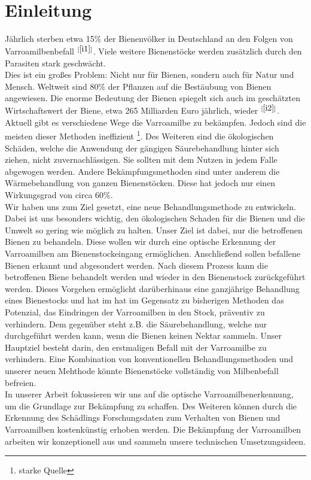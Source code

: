 \documentclass[11pt,a4paper]{article}
\newcommand{\bibRef}[1]{\hyperlink{#1}{$^{[\ref*{#1}{}]}$}}
\begin{document}
\section{Einleitung}
Jährlich sterben etwa 15\% der Bienenvölker in Deutschland an den Folgen von Varroamilbenbefall \bibRef{i1}.
Viele weitere Bienenstöcke werden zusätzlich durch den Parasiten stark geschwächt.\\
Dies ist ein großes Problem: Nicht nur für Bienen, sondern auch für Natur und Mensch. Weltweit sind 80\% der Pflanzen auf die Bestäubung von Bienen angewiesen. Die enorme Bedeutung der Bienen spiegelt sich auch im geschätzten Wirtschaftswert der Biene, etwa 265 Milliarden Euro jährlich, wieder \bibRef{i2}.
Aktuell gibt es verschiedene Wege die Varroamilbe zu bekämpfen. Jedoch sind die meisten dieser Methoden ineffizient \footnote{starke Quelle}. Des Weiteren sind die ökologischen Schäden, welche die Anwendung der gängigen Säurebehandlung hinter sich ziehen, nicht zuvernachlässigen. Sie sollten mit dem Nutzen in jedem Falle abgewogen werden. Andere Bekämpfungsmethoden sind unter anderem die Wärmebehandlung von ganzen Bienenstöcken. Diese hat jedoch nur einen Wirkungsgrad von circa 60\%.\\
Wir haben uns zum Ziel gesetzt, eine neue Behandlungsmethode zu entwickeln. Dabei ist uns besonders wichtig, den ökologischen Schaden für die Bienen und die Umwelt so gering wie möglich zu halten. Unser Ziel ist dabei, nur die betroffenen Bienen zu behandeln. Diese wollen wir durch eine optische Erkennung der Varroamilben am Bienenstockeingang ermöglichen. Anschließend sollen befallene Bienen erkannt und abgesondert werden. Nach diesem Prozess kann die betroffenen Biene behandelt werden und wieder in den Bienenstock zurückgeführt werden. Dieses Vorgehen ermöglicht darüberhinaus eine ganzjährige Behandlung eines Bienestocks und hat im hat im Gegensatz zu bisherigen Methoden das Potenzial, das Eindringen der Varroamilben in den Stock, präventiv zu verhindern.  Dem gegenüber steht z.B. die Säurebehandlung, welche nur durchgeführt werden kann, wenn die Bienen keinen Nektar sammeln. Unser Hauptziel besteht darin, den erstmaligen Befall mit der Varroamilbe zu verhindern. Eine Kombination von konventionellen Behandlungsmethoden und unserer neuen Mehthode könnte Bienenstöcke vollständig von Milbenbefall befreien.\\
In unserer Arbeit fokussieren wir uns auf die optische Varroamilbenerkennung, um die Grundlage zur Bekämpfung zu schaffen. Des Weiteren können durch die Erkennung des Schädlings Forschungsdaten zum Verhalten von Bienen und Varroamilben kostenkünstig erhoben werden. Die Bekämpfung der Varroamilben arbeiten wir konzeptionell aus und sammeln unsere technischen Umsetzungsideen.\\
\end{document}
